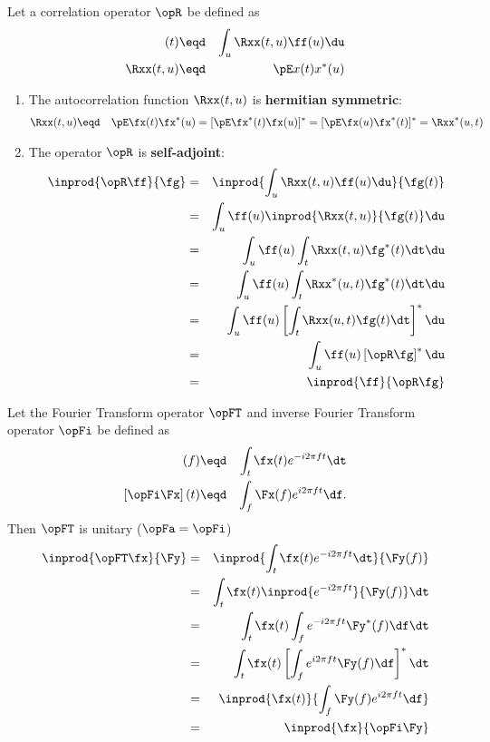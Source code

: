 \begin{example}
Let a correlation operator $\opR$ be defined as
  \begin{eqnarray*}
    [\opR \ff](t) &\eqd& \int_u \Rxx(t,u) \ff(u) \du  \\
    \Rxx(t,u) &\eqd& \pE x(t)x^\ast(u) 
  \end{eqnarray*}
\begin{enumerate}
  \item The autocorrelation function $\Rxx(t,u)$ is {\bf hermitian symmetric}:
    \begin{eqnarray*}
      \Rxx(t,u)
        &\eqd& \pE  \fx(t) \fx^\ast(u)
         =     [\pE \fx^\ast(t) \fx(u)]^\ast
         =     [\pE \fx(u) \fx^\ast(t)]^\ast
         =     \Rxx^\ast(u,t)
    \end{eqnarray*}

  \item The operator $\opR$ is {\bf self-adjoint}:
    \begin{eqnarray*}
      \inprod{\opR \ff}{\fg}
        &=& \inprod{\int_u \Rxx(t,u) \ff(u) \du}{\fg(t)}
      \\&=& \int_u \ff(u) \inprod{\Rxx(t,u) }{\fg(t)} \du
      \\&=& \int_u \ff(u) \int_t \Rxx(t,u) \fg^\ast(t) \dt \du
      \\&=& \int_u \ff(u) \int_t \Rxx^\ast(u,t) \fg^\ast(t) \dt \du
      \\&=& \int_u \ff(u) \left[\int_t \Rxx(u,t) \fg(t) \dt\right]^\ast \du
      \\&=& \int_u \ff(u) \left[\opR \fg \right]^\ast \du
      \\&=& \inprod{ \ff}{\opR \fg}
    \end{eqnarray*}
\end{enumerate}
\end{example}

\begin{example}
Let the Fourier Transform operator $\opFT$ and 
inverse Fourier Transform operator $\opFi$ be defined as
  \begin{eqnarray*}
    [\opFT \fx](f) &\eqd& \int_t \fx(t) e^{-i2\pi ft} \dt \\
    \left[\opFi \Fx\right](t) &\eqd& \int_f \Fx(f) e^{i2\pi ft} \df.
  \end{eqnarray*}
Then $\opFT$ is unitary ($\opFa = \opFi$)
  \begin{eqnarray*}
    \inprod{\opFT \fx}{\Fy}
      &=& \inprod{\int_t \fx(t) e^{-i2\pi ft} \dt }{\Fy(f)}
    \\&=& \int_t \fx(t) \inprod{e^{-i2\pi ft} }{\Fy(f)} \dt
    \\&=& \int_t \fx(t) \int_f e^{-i2\pi ft} \Fy^\ast(f) \df \dt
    \\&=& \int_t \fx(t) \left[\int_f e^{i2\pi ft} \Fy(f) \df \right]^\ast \dt
    \\&=& \inprod{\fx(t)}{\int_f \Fy(f) e^{i2\pi ft} \df }
    \\&=& \inprod{\fx}{\opFi \Fy}
  \end{eqnarray*}
\end{example}

